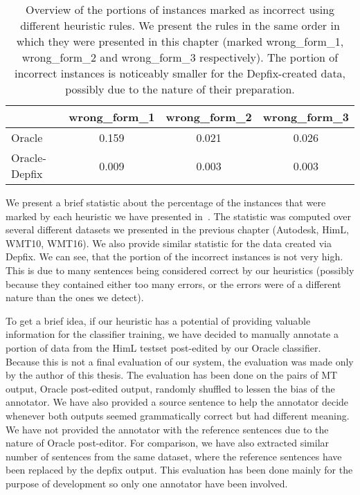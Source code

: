 \begin{table*}[t]
\centering
\small

\begin{tabular}{lccc}
  &  wrong\_form\_1  &  wrong\_form\_2  &  wrong\_form\_3  \\
\hline
Oracle  &  0.159  &  0.021  &  0.026  \\
Oracle-Depfix  & 0.009  &  0.003  &  0.003  \\
\end{tabular}
\caption{
Overview of the portions of instances marked as incorrect using different heuristic rules. We present
the rules in the same order in which they were presented in this chapter (marked wrong\_form\_1, wrong\_form\_2
and wrong\_form\_3 respectively). The portion of incorrect instances is noticeably smaller for the Depfix-created
data, possibly due to the nature of their preparation.
}
\label{marked-stats}
\end{table*}


We present a brief statistic about the percentage of the instances that were marked by each
heuristic we have presented in~. The statistic was computed over several different
datasets we presented in the previous chapter (Autodesk, HimL, WMT10, WMT16). We also provide
similar statistic for the data created via Depfix. We can see, that the portion of the incorrect instances
is not very high. This is due to many sentences being considered correct by our heuristics (possibly because
they contained either too many errors, or the errors were of a different nature than the ones we detect).

To get a brief idea, if our heuristic has a potential of providing valuable information for the classifier
training, we have decided to manually annotate a portion of data from the HimL testset post-edited by our
Oracle classifier. Because this is not a final evaluation of our system, the evaluation was made only
by the author of this thesis. The evaluation has been done on the pairs of MT output, Oracle post-edited
output, randomly shuffled to lessen the bias of the annotator. We have also provided a source sentence
to help the annotator decide whenever both outputs seemed grammatically correct but had different meaning.
We have not provided the annotator with the reference sentences due to the nature of Oracle post-editor. For comparison, we have also extracted
similar number of sentences from the same dataset, where the reference sentences have been replaced
by the depfix output. This evaluation has been done mainly for the purpose
of development so only one annotator have been involved.

